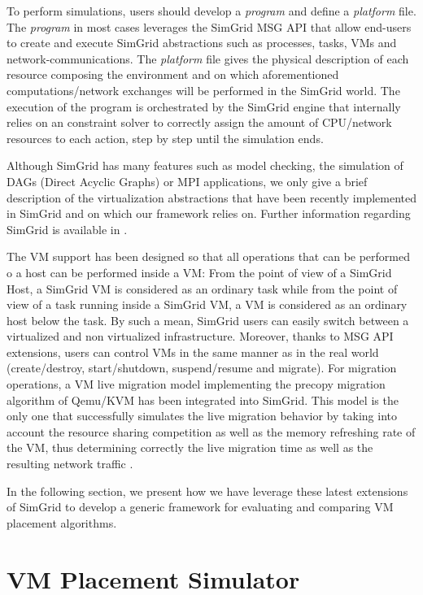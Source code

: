 \documentclass[conference]{IEEEtran}
\newcommand{\sg}{SimGrid\xspace}
\begin{document}
To perform simulations, users should develop  a \emph{program} and define a
\emph{platform} file. The \emph{program} in most cases leverages the \sg MSG API
that allow end-users to create and execute \sg abstractions such as processes, tasks, VMs and
network-communications. The \emph{platform} file gives the physical
description of each resource composing the environment and on which
aforementioned computations/network exchanges will be performed in the
\sg world.%
The execution of the program is orchestrated by the \sg engine that
internally relies on an constraint solver to correctly assign the
amount of CPU/network resources to each action, step by step until the
simulation ends.

Although SimGrid has many features such as model checking, the
simulation of DAGs (Direct Acyclic Graphs) or MPI applications, we
only give a brief description of the  virtualization  abstractions
that have been recently implemented in \sg and on which our framework relies
on.  Further information regarding \sg is available in \cite{casanova:hal-01017319}.

The VM support has been designed so that all operations that can be performed
o a host can be performed inside a VM: From the point of view of a \sg
Host, a \sg VM is considered as an ordinary task while from the point
of view of a task running inside a \sg VM, a VM is considered as an
ordinary host below the task.  By such a mean, \sg users can easily
switch between a virtualized and non virtualized infrastructure.
Moreover, thanks to  MSG API extensions, users can control VMs in the
same manner as in the real world (\eg create/destroy, start/shutdown,
suspend/resume and migrate).
For migration operations, a VM live migration model implementing the
precopy migration algorithm of Qemu/KVM has been integrated into \sg.
This model is the only one that successfully simulates the live
migration behavior by taking into account the resource sharing
competition as well as the memory refreshing rate of the VM, thus
determining correctly the live migration time as well as the resulting
network traffic \cite{Hirofuchi:2013:ALM:2568486.2568524}.

In the following section, we present how we have leverage these latest
extensions of \sg to develop a generic framework for evaluating and
comparing VM placement algorithms.

\section{VM Placement Simulator}
\label{sec:injector}
\end{document}
